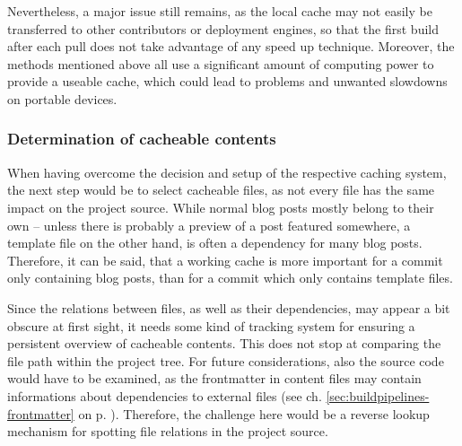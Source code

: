 Nevertheless, a major issue still remains, as the local cache may not easily be transferred to other contributors or deployment engines, so that the first build after each pull does not take advantage of any speed up technique. Moreover, the methods mentioned above all use a significant amount of computing power to provide a useable cache, which could lead to problems and unwanted slowdowns on portable devices.

\subsubsection{Determination of cacheable contents}
When having overcome the decision and setup of the respective caching system, the next step would be to select cacheable files, as not every file has the same impact on the project source. While normal blog posts mostly belong to their own --  unless there is probably a preview of a post featured somewhere, a template file on the other hand, is often a dependency for many blog posts. Therefore, it can be said, that a working cache is more important for a commit only containing blog posts, than for a commit which only contains template files.

Since the relations between files, as well as their dependencies, may appear a bit obscure at first sight, it needs some kind of tracking system for ensuring a persistent overview of cacheable contents. This does not stop at comparing the file path within the project tree. For future considerations, also the source code would have to be examined, as the frontmatter in content files may contain informations about dependencies to external files (see ch. \ref{sec:buildpipelines-frontmatter} on p. \pageref{sec:buildpipelines-frontmatter}). Therefore, the challenge here would be a reverse lookup mechanism for spotting file relations in the project source.
